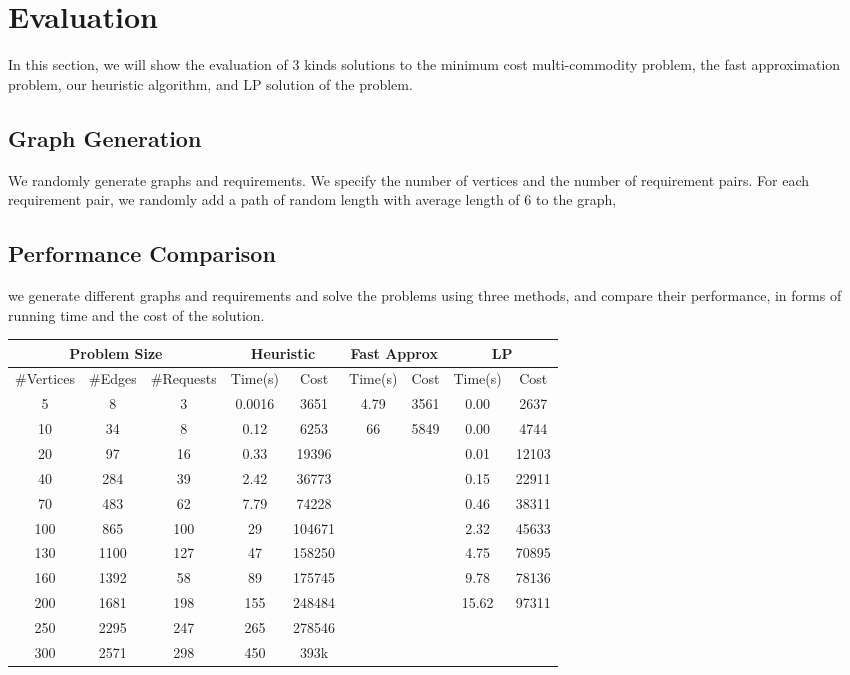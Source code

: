 \documentclass[a4paper]{article}
\begin{document}
\section {Evaluation}
In this section, we will show the evaluation of 3 kinds solutions to the minimum cost multi-commodity problem, the fast approximation problem, our heuristic algorithm, and LP solution of the problem. 
\subsection{Graph Generation}
We randomly generate graphs and requirements. We specify the number of vertices and the number of requirement pairs. For each requirement pair, we randomly add a path of random length with average length of 6 to the graph, 

\subsection{Performance Comparison}
we generate different graphs and requirements and solve the problems using three methods, and compare their performance, in forms of running time and the cost of the solution.

\begin{table}[H]
\centering
\begin{tabular}{|c|c|c|c|c|c|c|c|c|}
\hline
\multicolumn{3}{|c|}{Problem Size} & \multicolumn{2}{|c|}{Heuristic} & \multicolumn{2}{|c|}{Fast Approx} & \multicolumn{2}{|c|}{LP} \\
\hline
\#Vertices & \#Edges & \#Requests & Time(s) & Cost & Time(s) &  Cost & Time(s) & Cost \\
\hline
5 & 8 & 3 & 0.0016 & 3651 & 4.79 & 3561 & 0.00 & 2637 \\
\hline
10 & 34 & 8 & 0.12 & 6253 & 66 & 5849 & 0.00 & 4744 \\
\hline
20 & 97 & 16 & 0.33 & 19396 & & & 0.01 & 12103 \\
\hline
40 & 284 & 39 & 2.42 & 36773 & & & 0.15 & 22911 \\
\hline
70 & 483 & 62 & 7.79 & 74228 & & & 0.46 & 38311 \\
\hline 
100 & 865 & 100 & 29 & 104671 & & & 2.32 & 45633 \\
\hline
130 & 1100 & 127 & 47 & 158250 & & & 4.75 & 70895 \\
\hline
160 & 1392 & 58 & 89 & 175745 & & & 9.78 & 78136 \\
\hline
200 & 1681 & 198 & 155 & 248484 & & & 15.62 & 97311 \\
\hline
250&2295&247&265&278546&&&&\\
\hline
300&2571&298&450&393k&&&&\\

\hline
\end{tabular}
\end{table}
\end{document}
